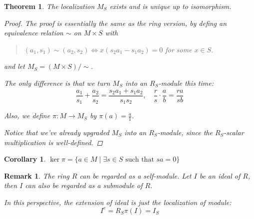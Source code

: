 \documentclass[a4paper]{article}
\theoremstyle{mystyle}
\newtheorem{theorem}{Theorem}
\newtheorem{remark}{Remark}
\newtheorem{coro}{Corollary}
\begin{document}
\begin{theorem}
  The localization $M_S$ exists and is unique up to isomorphism.
  \begin{proof}
    The proof is essentially the same as the ring version,
    by defing an equivalence relation $\sim$ on $M \times S$ with
    \begin{quote}
      $(a_1, s_1) \sim (a_2, s_2) \Longleftrightarrow x(s_2a_1- s_1a_2) = 0$ for some $x \in S$.
    \end{quote}

    and let $M_S = (M \times S) / \sim$.

    The only difference is that we turn $M_S$ into an $R_S$-module this time:
    $$\frac{a_1}{s_1} + \frac{a_2}{s_2} = \frac{s_2a_1 + s_1a_2}{s_1s_2},\quad
    \frac{r}{s} \cdot \frac{a}{b} = \frac{ra}{sb}$$

    Also, we define $\pi : M \to M_S$ by $\pi(a) = \frac{a}{1}$. 

    Notice that we've already upgraded $M_S$ into an $R_S$-module, since
    the $R_S$-scalar multiplication is well-defined.
  \end{proof}
\end{theorem}

\begin{coro}
  $\ker \pi = \{a \in M \mid \exists s \in S \textrm{ such that } sa = 0\}$
\end{coro}

\begin{remark}
  The ring $R$ can be regarded as a self-module.
  Let $I$ be an ideal of $R$, then $I$ can also be regarded 
  as a submodule of $R$.

  In this perspective, the extension of ideal is just the localization of module:
  \[
    I^e = R_S \pi(I) = I_S
  \]
\end{remark}
\end{document}
